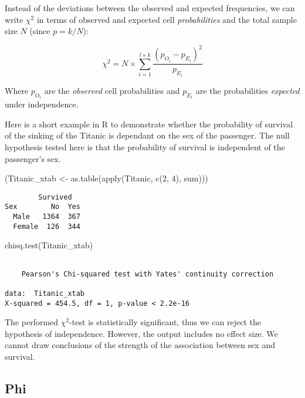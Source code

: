 \documentclass[
]{article}
\newenvironment{Shaded}{\begin{snugshade}}{\end{snugshade}}
\newcommand{\DecValTok}[1]{\textcolor[rgb]{0.00,0.00,0.81}{#1}}
\newcommand{\FunctionTok}[1]{\textcolor[rgb]{0.00,0.00,0.00}{#1}}
\newcommand{\NormalTok}[1]{#1}
\newcommand{\OtherTok}[1]{\textcolor[rgb]{0.56,0.35,0.01}{#1}}
\begin{document}
Instead of the deviations between the observed and expected frequencies,
we can write \(\chi^2\) in terms of observed and expected cell
\emph{probabilities} and the total sample size \(N\) (since \(p=k/N\)):

\[
\chi^2 = N\times\sum_{i=1}^{l\times k}{\frac{(p_{O_i}-p_{E_i})^2}{p_{E_i}}}
\]

Where \(p_{O_i}\) are the \emph{observed} cell probabilities and
\(p_{E_i}\) are the probabilities \emph{expected} under independence.

Here is a short example in R to demonstrate whether the probability of
survival of the sinking of the Titanic is dependant on the sex of the
passenger. The null hypothesis tested here is that the probability of
survival is independent of the passenger's sex.

\begin{Shaded}
\begin{Highlighting}[]
\NormalTok{(Titanic\_xtab }\OtherTok{\textless{}{-}} \FunctionTok{as.table}\NormalTok{(}\FunctionTok{apply}\NormalTok{(Titanic, }\FunctionTok{c}\NormalTok{(}\DecValTok{2}\NormalTok{, }\DecValTok{4}\NormalTok{), sum)))}
\end{Highlighting}
\end{Shaded}

\begin{verbatim}
        Survived
Sex        No  Yes
  Male   1364  367
  Female  126  344
\end{verbatim}

\begin{Shaded}
\begin{Highlighting}[]
\FunctionTok{chisq.test}\NormalTok{(Titanic\_xtab)}
\end{Highlighting}
\end{Shaded}

\begin{verbatim}

    Pearson's Chi-squared test with Yates' continuity correction

data:  Titanic_xtab
X-squared = 454.5, df = 1, p-value < 2.2e-16
\end{verbatim}

The performed \(\chi^2\)-test is statistically significant, thus we can
reject the hypothesis of independence. However, the output includes no
effect size. We cannot draw conclusions of the strength of the
association between sex and survival.

\hypertarget{phi}{%
\subsection{Phi}\label{phi}}
\end{document}

